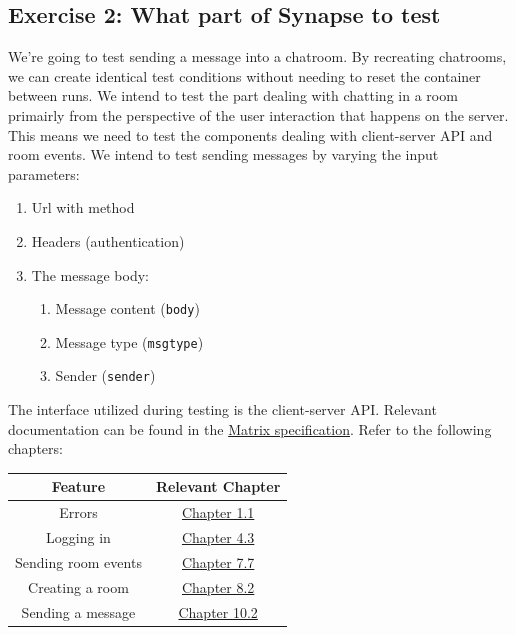 \documentclass[a4paper]{article}
\begin{document}
	\subsection{Exercise 2: What part of Synapse to test} \label{exercise-2-what-part-of-synapse-to-test}
	We're going to test sending a message into a chatroom. By recreating chatrooms, we can create identical test conditions without needing to reset the container between runs. We intend to test the part dealing with chatting in a room primairly from the perspective of the user interaction that happens on the server. This means we need to test the components dealing with client-server API and room events. We intend to test sending messages by varying the input parameters:
	\begin{enumerate}
		\item Url with method
		\item Headers (authentication)
		\item The message body:
		\begin{enumerate}    
			\item Message content (\texttt{body})    
			\item Message type  (\texttt{msgtype})    
			\item Sender (\texttt{sender})
		\end{enumerate}
	\end{enumerate}
	
	The interface utilized during testing is the client-server API. Relevant documentation can be found in the \href{https://spec.matrix.org/v1.19/client-server-api/}{Matrix specification}. Refer to the following chapters:
	
	\begin{table}[h]
		\center
		\small
		\begin{tabular}{|c|c|}
			\hline
			\textbf{Feature} & \textbf{Relevant Chapter} \\
			\hline
			Errors & \href{https://spec.matrix.org/v1.19/client-server-api/\#standard-error-response}{Chapter 1.1} \\
			\hline
			Logging in & \href{https://spec.matrix.org/v1.19/client-server-api/\#login}{Chapter 4.3} \\
			\hline
			Sending room events & \href{https://spec.matrix.org/v1.19/client-server-api/\#sending-events-to-a-room}{Chapter 7.7} \\
			\hline
			Creating a room & \href{https://spec.matrix.org/v1.19/client-server-api/\#creation}{Chapter 8.2} \\
			\hline
			Sending a message & \href{https://spec.matrix.org/v1.19/client-server-api/\#instant-messaging}{Chapter 10.2} \\
			\hline
		\end{tabular}
	\end{table}
\end{document}
